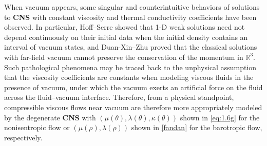 \documentclass[11pt,reqno]{amsart}
\numberwithin{rk}{section}
\numberwithin{prop}{section}
\numberwithin{mydef}{section}
\numberwithin{lem}{section}
\numberwithin{equation}{section}
\numberwithin{thm}{section}
\begin{document}
When vacuum appears, 
some  singular and counterintuitive behaviors of solutions to \textbf{CNS} with constant viscosity and thermal conductivity coefficients have been observed.
In particular,  Hoff--Serre \cite{hoffserre} showed that  1-D weak solutions need not depend continuously on their initial data when the initial density contains an interval of vacuum states,  and Duan-Xin--Zhu \cite{dxz}  proved that the classical solutions with far-field vacuum  cannot preserve the conservation of the momentum in $\mathbb{R}^3$.
Such pathological phenomena may be traced back to the unphysical assumption that the viscosity coefficients are constants when modeling viscous fluids in the presence of vacuum, under which the vacuum exerts an artificial force on the fluid across the fluid--vacuum interface. Therefore, from  a physical standpoint, compressible viscous flows near vacuum are therefore more appropriately modeled by the degenerate  \textbf{CNS} with $(\mu(\theta),\lambda(\theta),\kappa(\theta))$ shown  in \eqref{eq:1.6g} for the nonisentropic flow or $(\mu(\rho),\lambda(\rho))$ shown in \eqref{fandan} for the barotropic flow, respectively. 
\end{document}
